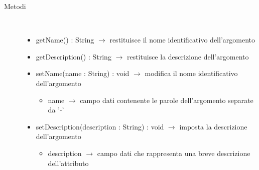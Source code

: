 \begin{description}
\item[Metodi] \hfill \\
\vspace{-7mm}
\begin{itemize}
	\item getName() : String $\rightarrow$ restituisce il nome identificativo dell'argomento
	\item getDescription() : String $\rightarrow$ restituisce la descrizione dell'argomento
	\item setName(name : String) : void $\rightarrow$ modifica il nome identificativo dell'argomento\begin{itemize}
		\item name $\rightarrow$ campo dati contenente le parole dell'argomento separate da '-'
	\end{itemize}
	
	\item setDescription(description : String) : void $\rightarrow$ imposta la descrizione dell'argomento\begin{itemize}
		\item description $\rightarrow$ campo dati che rappresenta una breve descrizione dell'attributo
	\end{itemize}
	
\end{itemize}

\end{description}

\vspace{0.5cm}
\hypertarget{server::data::Questionnaire}{}
